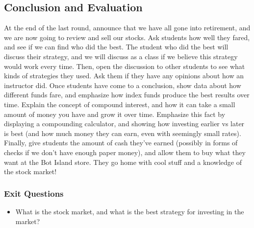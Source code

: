 \documentclass{lessonplan}
\begin{document}
    \subsection{Conclusion and Evaluation}
      At the end of the last round, announce that we have all gone into retirement, and we are now going to review
      and sell our stocks. Ask students how well they fared, and see if we can find who did the best. The student
      who did the best will discuss their strategy, and we will discuss as a class if we believe this strategy would
      work every time. Then, open the discussion to other students to see what kinds of strategies they used.
      Ask them if they have any opinions about how an instructor did. Once students have come to a conclusion,
      show data about how different funds fare, and emphasize how index funds produce the best results over
      time. Explain the concept of compound interest, and how it can take a small amount of money you have
      and grow it over time. Emphasize this fact by displaying a compounding calculator, and showing how 
      investing earlier vs later is best (and how much money they can earn, even with seemingly small rates).
      Finally, give students the amount of cash they've earned (possibly in forms of checks if we don't have
      enough paper money), and allow them to buy what they want at the Bot Island store.
      They go home with cool stuff and a knowledge of the stock market!
      \subsubsection{Exit Questions}
      \begin{itemize}
        \item What is the stock market, and what is the best strategy for investing in the market?
      \end{itemize}
\end{document}
